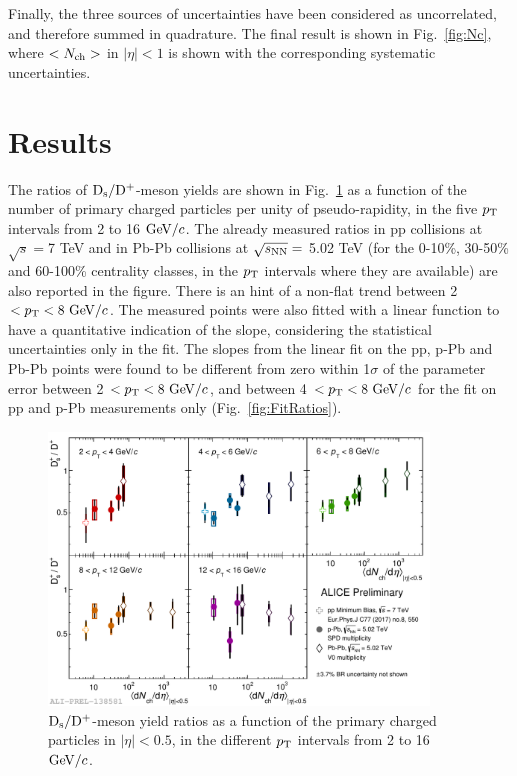 Finally, the three sources of uncertainties have been considered as 
uncorrelated, and therefore summed in quadrature. The final result 
is shown in Fig.~\ref{fig:Nc}, where $<N_{\rm ch}>$ in $|\eta|<1$ is shown 
with the corresponding systematic uncertainties.


\section{Results}
\label{sec:results}
The ratios of ${\rm D_s}/{\rm D^+}$-meson yields are shown in Fig.~\ref{fig:DsDplusRatios} as a function of
the number of primary charged particles per unity of pseudo-rapidity, 
in the five $p_{\rm T}$ intervals from 2 to 16 $\mathrm{GeV}/c$.
The already measured ratios in pp collisions at $\sqrt{s}=$7 TeV and 
in Pb-Pb collisions at $\sqrt{s_{\rm NN}}=$ 5.02 TeV
(for the 0-10\%, 30-50\% and 60-100\% centrality classes, in the 
$p_{\rm T}$ intervals where they are available) are also reported in the figure.
There is an hint of a non-flat trend between 2 $< p_{\rm T} < 8~\mathrm{GeV}/c$. The measured points were also
fitted with a linear function to have a quantitative indication of the slope, considering the statistical 
uncertainties only in the fit. The slopes from the linear fit on the pp, 
p-Pb and Pb-Pb points were found to be different from zero within 
1$\sigma$ of the parameter error between 2 $< p_{\rm T} < 8 ~\mathrm{GeV}/c$, and between 4 $< p_{\rm T} < 8 ~\mathrm{GeV}/c$ for the
fit on pp and p-Pb measurements only (Fig.~\ref{fig:FitRatios}).

\begin{figure}[h!]
    \begin{center}
          \includegraphics[width=0.9\textwidth]{./FigCap6/DsOverDplusVsMult_pp_pPb_PbPb.pdf}
    \end{center}
    \caption{ ${\rm D_s}/{\rm D^+}$-meson yield ratios as a function of the primary charged particles in $|\eta|<0.5$, in the different $p_{\rm T}$ intervals from 2 to 16 $\mathrm{GeV}/c$.}
    \label{fig:DsDplusRatios}
\end{figure}

